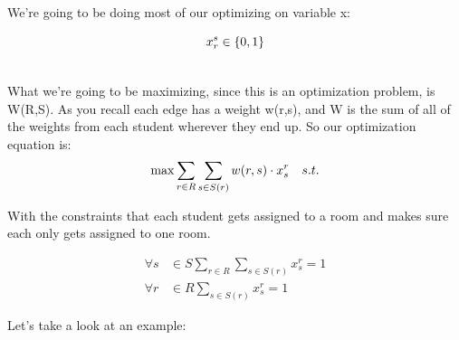 \documentclass[12pt]{article}
\begin{document}
\\
\\ 

\noindent We're going to be doing most of our optimizing on variable x:

\begin{equation*}
\noindent{x_r^s \in \{0, 1\}\\} 
\end{equation*}


\\

What we're going to be maximizing, since this is an optimization problem, is W(R,S). As you recall each edge has a weight w(r,s), and W is the sum of all of the weights from each student wherever they end up. So our optimization equation is:\\

\begin{equation*}
\max\sum_{r\in{R}}\sum_{s\in{S(r)}}w(r,s)\cdot{x_s^r}\quad{s.t.}\\
\end{equation*}

With the constraints that each student gets assigned to a room and makes sure each only gets assigned to one room.

\begin{align*}
\forall{s}&\in{S}\sum_{r\in{R}}\sum_{s\in{S(r)}}x_s^r=1\\
\forall{r}&\in{R}\sum_{s\in{S(r)}}x_s^r=1
\end{align*}

Let's take a look at an example:\\
\end{document}
